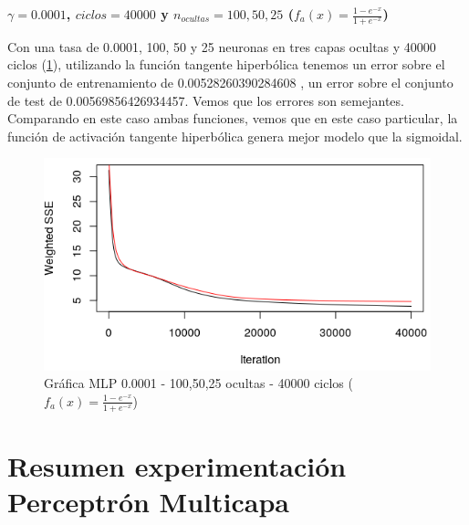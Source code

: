 \documentclass[11pt,spanish,listoffigures,listoftables]{workluis}
\begin{document}
\par \textbf{$\gamma = 0.0001$, $ciclos = 40000$ y $n_{ocultas} = 100, 50, 25$ ($f_{a}(x) = \frac{1-e^{-x}}{1+e^{-x}}$)}

\par Con una tasa de 0.0001, 100, 50 y 25 neuronas en tres capas ocultas y 40000 ciclos (\ref{fig:10050250000140000tan}), utilizando la función tangente hiperbólica tenemos un error sobre el conjunto de entrenamiento de 0.00528260390284608
, un error sobre el conjunto de test de 0.00569856426934457. Vemos que los errores son semejantes. Comparando en este caso ambas funciones, vemos que en este caso particular, la función de activación tangente hiperbólica genera mejor modelo que la sigmoidal.

\begin{figure}[H]
\centering
\includegraphics[scale=0.5]{10050250000140000tan}
\caption{Gráfica MLP 0.0001 - 100,50,25 ocultas - 40000 ciclos ($f_{a}(x) = \frac{1-e^{-x}}{1+e^{-x}}$)}\label{fig:10050250000140000tan}
\end{figure}

\section{Resumen experimentación Perceptrón Multicapa}
\end{document}
